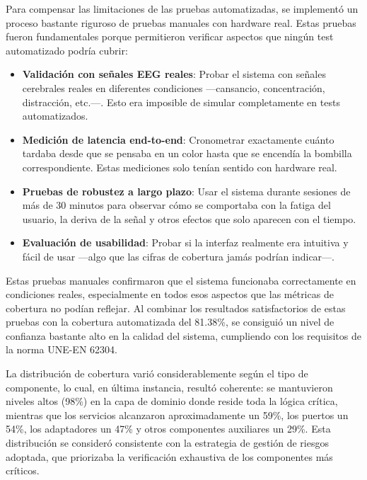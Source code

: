 Para compensar las limitaciones de las pruebas automatizadas, se implementó un proceso bastante riguroso de pruebas manuales con hardware real. Estas pruebas fueron fundamentales porque permitieron verificar aspectos que ningún test automatizado podría cubrir:

\begin{itemize}
    \item \textbf{Validación con señales EEG reales}: Probar el sistema con señales cerebrales reales en diferentes condiciones —cansancio, concentración, distracción, etc.—. Esto era imposible de simular completamente en tests automatizados.
    
    \item \textbf{Medición de latencia end-to-end}: Cronometrar exactamente cuánto tardaba desde que se pensaba en un color hasta que se encendía la bombilla correspondiente. Estas mediciones solo tenían sentido con hardware real.
    
    \item \textbf{Pruebas de robustez a largo plazo}: Usar el sistema durante sesiones de más de 30 minutos para observar cómo se comportaba con la fatiga del usuario, la deriva de la señal y otros efectos que solo aparecen con el tiempo.
    
    \item \textbf{Evaluación de usabilidad}: Probar si la interfaz realmente era intuitiva y fácil de usar —algo que las cifras de cobertura jamás podrían indicar—.
\end{itemize}

Estas pruebas manuales confirmaron que el sistema funcionaba correctamente en condiciones reales, especialmente en todos esos aspectos que las métricas de cobertura no podían reflejar. Al combinar los resultados satisfactorios de estas pruebas con la cobertura automatizada del 81.38\%, se consiguió un nivel de confianza bastante alto en la calidad del sistema, cumpliendo con los requisitos de la norma UNE-EN 62304.

La distribución de cobertura varió considerablemente según el tipo de componente, lo cual, en última instancia, resultó coherente: se mantuvieron niveles altos (98\%) en la capa de dominio donde reside toda la lógica crítica, mientras que los servicios alcanzaron aproximadamente un 59\%, los puertos un 54\%, los adaptadores un 47\% y otros componentes auxiliares un 29\%. Esta distribución se consideró consistente con la estrategia de gestión de riesgos adoptada, que priorizaba la verificación exhaustiva de los componentes más críticos.

